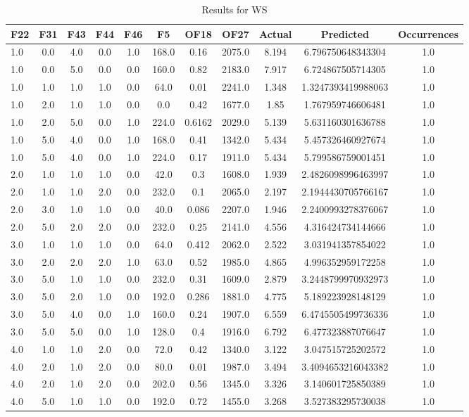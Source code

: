 \clearpage
\begin{table}[htbp]
\centering
\begin{tabular}{|l|c|c|c|c|c|c|c|c|c|c|}
\hline
F22 & F31 & F43 & F44 & F46 & F5 & OF18 & OF27 & Actual & Predicted & Occurrences \\
\hline
1.0 & 0.0 & 4.0 & 0.0 & 1.0 & 168.0 & 0.16 & 2075.0 & 8.194 & 6.796750648343304 & 1.0 \\
1.0 & 0.0 & 5.0 & 0.0 & 0.0 & 160.0 & 0.82 & 2183.0 & 7.917 & 6.724867505714305 & 1.0 \\
1.0 & 1.0 & 1.0 & 1.0 & 0.0 & 64.0 & 0.01 & 2241.0 & 1.348 & 1.3247393419988063 & 1.0 \\
1.0 & 2.0 & 1.0 & 1.0 & 0.0 & 0.0 & 0.42 & 1677.0 & 1.85 & 1.767959746606481 & 1.0 \\
1.0 & 2.0 & 5.0 & 0.0 & 1.0 & 224.0 & 0.6162 & 2029.0 & 5.139 & 5.631160301636788 & 1.0 \\
1.0 & 5.0 & 4.0 & 0.0 & 1.0 & 168.0 & 0.41 & 1342.0 & 5.434 & 5.457326460927674 & 1.0 \\
1.0 & 5.0 & 4.0 & 0.0 & 1.0 & 224.0 & 0.17 & 1911.0 & 5.434 & 5.799586759001451 & 1.0 \\
2.0 & 1.0 & 1.0 & 1.0 & 0.0 & 42.0 & 0.3 & 1608.0 & 1.939 & 2.4826098996463997 & 1.0 \\
2.0 & 1.0 & 1.0 & 2.0 & 0.0 & 232.0 & 0.1 & 2065.0 & 2.197 & 2.1944430705766167 & 1.0 \\
2.0 & 3.0 & 1.0 & 1.0 & 0.0 & 40.0 & 0.086 & 2207.0 & 1.946 & 2.2400993278376067 & 1.0 \\
2.0 & 5.0 & 2.0 & 2.0 & 0.0 & 232.0 & 0.25 & 2141.0 & 4.556 & 4.316424734144666 & 1.0 \\
3.0 & 1.0 & 1.0 & 1.0 & 0.0 & 64.0 & 0.412 & 2062.0 & 2.522 & 3.031941357854022 & 1.0 \\
3.0 & 2.0 & 2.0 & 2.0 & 1.0 & 63.0 & 0.52 & 1985.0 & 4.865 & 4.996352959172258 & 1.0 \\
3.0 & 5.0 & 1.0 & 1.0 & 0.0 & 232.0 & 0.31 & 1609.0 & 2.879 & 3.2448799970932973 & 1.0 \\
3.0 & 5.0 & 2.0 & 1.0 & 0.0 & 192.0 & 0.286 & 1881.0 & 4.775 & 5.189223928148129 & 1.0 \\
3.0 & 5.0 & 4.0 & 0.0 & 1.0 & 160.0 & 0.24 & 1907.0 & 6.559 & 6.4745505499736336 & 1.0 \\
3.0 & 5.0 & 5.0 & 0.0 & 1.0 & 128.0 & 0.4 & 1916.0 & 6.792 & 6.477323887076647 & 1.0 \\
4.0 & 1.0 & 1.0 & 2.0 & 0.0 & 72.0 & 0.42 & 1340.0 & 3.122 & 3.047515725202572 & 1.0 \\
4.0 & 2.0 & 1.0 & 2.0 & 0.0 & 80.0 & 0.01 & 1987.0 & 3.494 & 3.4094653216043382 & 1.0 \\
4.0 & 2.0 & 1.0 & 2.0 & 0.0 & 202.0 & 0.56 & 1345.0 & 3.326 & 3.140601725850389 & 1.0 \\
4.0 & 5.0 & 1.0 & 1.0 & 0.0 & 192.0 & 0.72 & 1455.0 & 3.268 & 3.527383295730038 & 1.0 \\
\hline
\end{tabular}
\caption{Results for WS}
\label{tab:WS_results}
\end{table}
